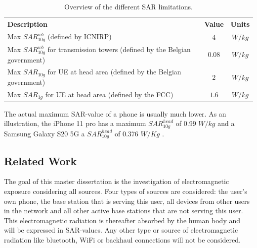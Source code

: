 \begin{table}[h!]
\begin{tabular}{|l|c|c|}
\hline
\textbf{Description} & \textbf{Value} & \textbf{Units} \\ \hline
Max $SAR^{wb}_{10g}$ (defined by \gls{ICNIRP})                           &  $4$ & $W/kg$              \\ \hline
Max $SAR^{wb}_{10g}$ for transmission towers (defined by the Belgian government)                & $0.08$ & $W/kg$               \\ \hline
Max $SAR_{10g}$ for \acs{UE} at head area (defined by the Belgian government)                  & $2$ & $W/kg$               \\ \hline
Max $SAR_{1g}$ for \acs{UE} at head area (defined by the \gls{FCC})                  & $1.6$ & $W/kg$               \\ \hline
\end{tabular}
\caption{Overview of the different \acs{SAR} limitations.}
\label{table:overviewSARValues}
\end{table}

The actual maximum \gls{SAR}-value of a phone is usually much lower. As an illustration, the 
iPhone 11 pro has a maximum $SAR_{10g}^{head}$ of 0.99 $W/kg$ \cite{S21} and a Samsung Galaxy S20 5G a
 $SAR_{10g}^{head}$ of 0.376 $W/Kg$ \cite{S22}. 

\subsection{Related Work} %
\label{sub:general}
The goal of this master dissertation is the investigation of electromagnetic exposure considering all sources. Four types of sources are considered: the user's own phone,
 the base station that is serving this user, 
all devices from other users in the network and all 
other active base stations that are not serving this user. This electromagnetic radiation is thereafter
absorbed by the human body and will be expressed in \gls{SAR}-values. 
Any other type or source of electromagnetic radiation like bluetooth, WiFi or backhaul connections will not be considered.

